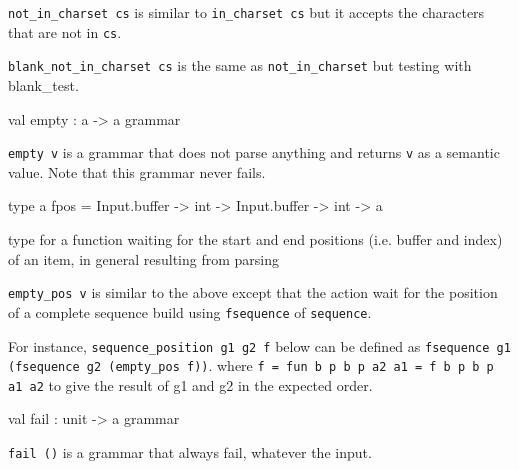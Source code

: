 \documentclass[11pt]{article}
\begin{document}
{\tt{not\_in\_charset cs}} is similar to  {\tt{in\_charset cs}}  but  it  accepts
    the characters that are not in {\tt{cs}}.



{\tt{blank\_not\_in\_charset cs}} is the same as {\tt{not\_in\_charset}} but
    testing with blank\_test.



\label{val:Earley.empty}\begin{ocamldoccode}
val empty : {\textquotesingle}a -> {\textquotesingle}a grammar
\end{ocamldoccode}
\begin{ocamldocdescription}
{\tt{empty v}} is a grammar that does not parse anything and returns  {\tt{v}}
    as a semantic value. Note that this grammar never fails.


\end{ocamldocdescription}




\label{type:Earley.fpos}\begin{ocamldoccode}
type {\textquotesingle}a fpos = Input.buffer -> int -> Input.buffer -> int -> {\textquotesingle}a 
\end{ocamldoccode}
\begin{ocamldocdescription}
type for a function waiting for the start and end positions
    (i.e. buffer and index) of an item, in general resulting from parsing


\end{ocamldocdescription}




{\tt{empty\_pos v}} is similar to the above except that the action
    wait for the position of a complete sequence build using
     {\tt{fsequence}} of {\tt{sequence}}.


     For instance, {\tt{sequence\_position g1 g2 f}} below can be defined
     as {\tt{fsequence g1 (fsequence g2 (empty\_pos f{\textquotesingle}))}}.
     where {\tt{f{\textquotesingle} = fun b p b{\textquotesingle} p{\textquotesingle} a2 a1 = f b p b{\textquotesingle} p{\textquotesingle} a1 a2}} to give
     the result of g1 and g2 in the expected order.



\label{val:Earley.fail}\begin{ocamldoccode}
val fail : unit -> {\textquotesingle}a grammar
\end{ocamldoccode}
\begin{ocamldocdescription}
{\tt{fail ()}} is a grammar that always fail, whatever the input.


\end{ocamldocdescription}
\end{document}
